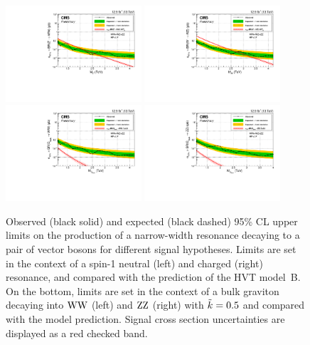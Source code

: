 \begin{figure}[h!]
\centering
     \includegraphics[width=0.45\textwidth]{figures/analysis/search2/B2G-16-021/figures/limits/brazilianFlag_ZprimeWW_new_combined_13TeV.pdf}
     \includegraphics[width=0.45\textwidth]{figures/analysis/search2/B2G-16-021/figures/limits/brazilianFlag_WZ_new_combined_13TeV.pdf}\\
     \includegraphics[width=0.45\textwidth]{figures/analysis/search2/B2G-16-021/figures/limits/brazilianFlag_BulkWW_new_combined_13TeV.pdf}
     \includegraphics[width=0.45\textwidth]{figures/analysis/search2/B2G-16-021/figures/limits/brazilianFlag_BulkZZ_new_combined_13TeV.pdf}
\caption{Observed (black solid) and expected (black dashed) 95\% CL upper limits on the production of a narrow-width resonance decaying to a pair of vector bosons for different signal hypotheses. Limits are set in the context of a spin-1 neutral \PZpr (left) and charged \PWpr (right) resonance, and compared with the prediction of the HVT model~B. On the bottom, limits are set in the context of a bulk graviton decaying into $\mathrm{W}\mathrm{W}$ (left) and $\mathrm{Z}\mathrm{Z}$ (right) with $\tilde{k} =0.5$ and compared with the model prediction. Signal cross section uncertainties are displayed as a red checked band.}
\label{fig:searchII:limitCombined}
\end{figure}
